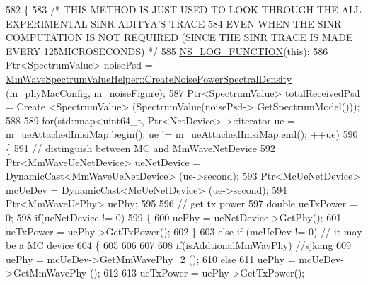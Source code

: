 \begin{DoxyCode}
582 \{
583         \textcolor{comment}{/* THIS METHOD IS JUST USED TO LOOK THROUGH THE ALL EXPERIMENTAL SINR ADITYA'S TRACE}
584 \textcolor{comment}{        EVEN WHEN THE SINR COMPUTATION IS NOT REQUIRED (SINCE THE SINR TRACE IS MADE EVERY 125MICROSECONDS)
       */}
585  \hyperlink{log-macros-disabled_8h_a90b90d5bad1f39cb1b64923ea94c0761}{NS\_LOG\_FUNCTION}(\textcolor{keyword}{this});
586         Ptr<SpectrumValue> noisePsd = 
      \hyperlink{classns3_1_1MmWaveSpectrumValueHelper_ae17f7f89a0ce6934b94886b463c6db44}{MmWaveSpectrumValueHelper::CreateNoisePowerSpectralDensity}
       (\hyperlink{classns3_1_1MmWavePhy_a869abf36bbdbb94eed77ba6e4846f6e4}{m\_phyMacConfig}, \hyperlink{classns3_1_1MmWavePhy_ac3010f7611906c8dc5e93bc13ff79819}{m\_noiseFigure});
587         Ptr<SpectrumValue> totalReceivedPsd = Create <SpectrumValue> (SpectrumValue(noisePsd->
      GetSpectrumModel()));
588 
589         \textcolor{keywordflow}{for}(std::map<uint64\_t, Ptr<NetDevice> >::iterator ue = 
      \hyperlink{classns3_1_1MmWaveEnbPhy_a1e8b3730ff37d9fc19d9ec07f06e6be5}{m\_ueAttachedImsiMap}.begin(); ue != \hyperlink{classns3_1_1MmWaveEnbPhy_a1e8b3730ff37d9fc19d9ec07f06e6be5}{m\_ueAttachedImsiMap}.end(); ++ue)
590         \{
591                 \textcolor{comment}{// distinguish between MC and MmWaveNetDevice}
592                 Ptr<MmWaveUeNetDevice> ueNetDevice = DynamicCast<MmWaveUeNetDevice> (ue->second);
593                 Ptr<McUeNetDevice> mcUeDev = DynamicCast<McUeNetDevice> (ue->second);
594                 Ptr<MmWaveUePhy> uePhy;
595 
596                 \textcolor{comment}{// get tx power}
597                 \textcolor{keywordtype}{double} ueTxPower = 0;
598                 \textcolor{keywordflow}{if}(ueNetDevice != 0) 
599                 \{
600                         uePhy = ueNetDevice->GetPhy();
601                         ueTxPower = uePhy->GetTxPower();
602                 \}
603                 \textcolor{keywordflow}{else} \textcolor{keywordflow}{if} (mcUeDev != 0) \textcolor{comment}{// it may be a MC device}
604                 \{
605                         
606 
607 
608                         \textcolor{keywordflow}{if}(\hyperlink{classns3_1_1MmWaveEnbPhy_a1a171ed81b1efedf963000d89f2cbd98}{isAddtionalMmWavPhy}) \textcolor{comment}{//sjkang}
609                                 uePhy = mcUeDev->GetMmWavePhy\_2 ();
610                         \textcolor{keywordflow}{else}
611                                 uePhy = mcUeDev->GetMmWavePhy ();
612 
613                         ueTxPower = uePhy->GetTxPower();

\end{DoxyCode}
